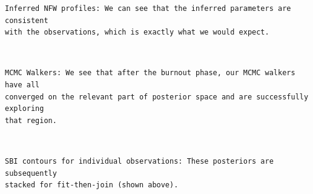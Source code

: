 \documentclass[11pt]{article}
\begin{document}
    \begin{Verbatim}[commandchars=\\\{\}]
Inferred NFW profiles: We can see that the inferred parameters are consistent
with the observations, which is exactly what we would expect.
    \end{Verbatim}

    \begin{center}
    \end{center}
    { \hspace*{\fill} \\}
    
    \begin{Verbatim}[commandchars=\\\{\}]
MCMC Walkers: We see that after the burnout phase, our MCMC walkers have all
converged on the relevant part of posterior space and are successfully exploring
that region.
    \end{Verbatim}

    \begin{center}
    \end{center}
    { \hspace*{\fill} \\}
    
    \begin{Verbatim}[commandchars=\\\{\}]
SBI contours for individual observations: These posteriors are subsequently
stacked for fit-then-join (shown above).
    \end{Verbatim}

    \begin{center}
    \end{center}
    { \hspace*{\fill} \\}
    

    
    
    
\end{document}
